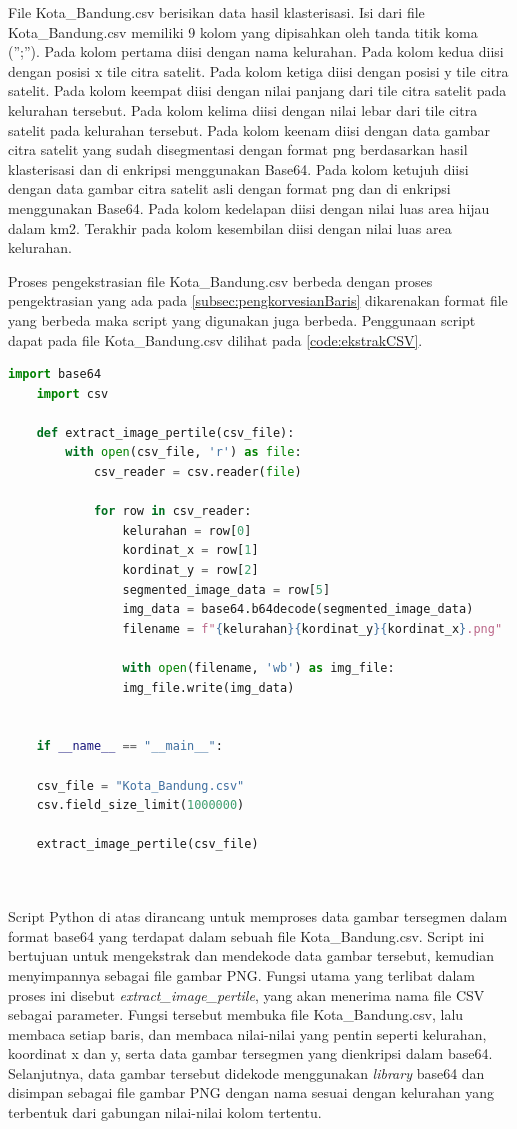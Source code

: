 File Kota\_Bandung.csv berisikan data hasil klasterisasi. Isi dari file Kota\_Bandung.csv memiliki 9 kolom yang dipisahkan oleh tanda titik koma (”;”). Pada kolom pertama diisi dengan nama kelurahan. Pada kolom kedua diisi dengan posisi x tile citra satelit. Pada kolom ketiga diisi dengan posisi y tile citra satelit. Pada kolom keempat diisi dengan nilai panjang dari tile citra satelit pada kelurahan tersebut. Pada kolom kelima diisi dengan nilai lebar dari tile citra satelit pada kelurahan tersebut. Pada kolom keenam diisi dengan data gambar citra satelit yang sudah disegmentasi dengan format png berdasarkan hasil klasterisasi dan di enkripsi menggunakan Base64. Pada kolom ketujuh diisi dengan data gambar citra satelit asli dengan format png dan di enkripsi menggunakan Base64. Pada kolom kedelapan diisi dengan nilai luas area hijau dalam km2. Terakhir pada kolom kesembilan diisi dengan nilai luas area kelurahan.\cite{juan:22:pengumpulan} 

Proses pengekstrasian file Kota\_Bandung.csv berbeda dengan proses pengektrasian yang ada pada \ref{subsec:pengkorvesianBaris} dikarenakan format file yang berbeda maka script yang digunakan juga berbeda. Penggunaan script dapat pada file Kota\_Bandung.csv dilihat pada \ref{code:ekstrakCSV}. 
\begin{lstlisting}[language=Python, caption=Script Penggabungan Gambar Hasil Klasterisasi ,label={code:ekstrakCSV}]
	import base64
	import csv
	
	def extract_image_pertile(csv_file):
		with open(csv_file, 'r') as file:
			csv_reader = csv.reader(file)
	
			for row in csv_reader:
				kelurahan = row[0]
				kordinat_x = row[1]
				kordinat_y = row[2]
				segmented_image_data = row[5]
				img_data = base64.b64decode(segmented_image_data)
				filename = f"{kelurahan}{kordinat_y}{kordinat_x}.png"
				
				with open(filename, 'wb') as img_file:
				img_file.write(img_data)
	
	
	if __name__ == "__main__":
	
	csv_file = "Kota_Bandung.csv"
	csv.field_size_limit(1000000)
	
	extract_image_pertile(csv_file)
	
	
\end{lstlisting}

Script Python di atas dirancang untuk memproses data gambar tersegmen dalam format base64 yang terdapat dalam sebuah file Kota\_Bandung.csv. Script ini  bertujuan untuk mengekstrak dan mendekode data gambar tersebut, kemudian menyimpannya sebagai file gambar PNG. Fungsi utama yang terlibat dalam proses ini disebut \textit{extract\_image\_pertile}, yang akan menerima nama file CSV sebagai parameter. Fungsi tersebut membuka file Kota\_Bandung.csv, lalu membaca setiap baris, dan membaca nilai-nilai yang pentin seperti kelurahan, koordinat x dan y, serta data gambar tersegmen yang dienkripsi dalam base64. Selanjutnya, data gambar tersebut didekode menggunakan \textit{library }base64 dan disimpan sebagai file gambar PNG dengan nama sesuai dengan kelurahan yang terbentuk dari gabungan nilai-nilai kolom tertentu.

